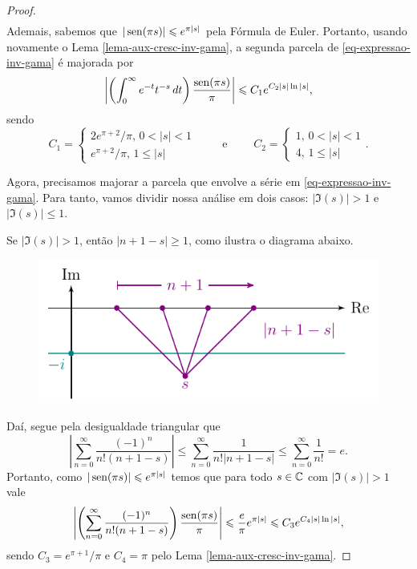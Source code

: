 \begin{proof}
\begin{align*}
        \end{align*}
        Ademais, sabemos que $|\operatorname{sen}(\pi s)| \leqslant e^{\pi |s|}$ pela Fórmula de Euler. 
        Portanto,
        usando novamente o Lema \ref{lema-aux-cresc-inv-gama},
        a segunda parcela de \eqref{eq-expressao-inv-gama} é majorada por
        \begin{equation}
            \left| \left( \int_0^{\infty} e^{-t}t^{-s} \, dt \right)\frac{\operatorname{sen}(\pi s)}{\pi} \right|
            \leqslant
            C_1e^{C_2|s|\ln|s|},
        \end{equation}
        sendo
        \[
        C_1 = \begin{cases}
            2e^{\pi + 2}/\pi, \, 0 < |s| < 1 \\
            e^{\pi + 2}/\pi, \, 1\leq |s|
        \end{cases} \qquad \text{ e } \qquad
        C_2 = \begin{cases}
            1, \, 0 < |s| < 1 \\
            4, \, 1\leq |s|
        \end{cases}.
        \]
        
        Agora, precisamos majorar a parcela que envolve a série em \eqref{eq-expressao-inv-gama}.
        Para tanto, vamos dividir nossa análise em dois casos: $|\Im(s)| > 1$ e $|\Im(s)|\leq 1$.
        
        Se $|\Im(s)| > 1$, então $|n+1-s| \geq 1$, como ilustra o diagrama abaixo.
        \begin{figure}[H]\centering
            \includegraphics{Figuras/Im(s)>1.pdf}
        \end{figure}
        Daí, segue pela desigualdade triangular que
        \[
        \left| \sum_{n=0}^{\infty} \frac{(-1)^n}{n!(n+1-s)} \right| 
        \leq \sum_{n=0}^{\infty} \frac{1}{n!|n+1-s|} 
        \leq \sum_{n=0}^{\infty} \frac{1}{n!}
        = e.
        \]
        Portanto, como $|\operatorname{sen}(\pi s)| \leqslant e^{\pi |s|}$ temos que para 
        todo $s\in\mathbb{C}$ com $|\Im(s)|>1$
        vale
        \[
        \left| \left(\sum_{n=0}^{\infty} \frac{(-1)^n}{n!(n+1-s)}\right)\frac{\operatorname{sen}(\pi s)}{\pi} \right|
        \leqslant \frac{e}{\pi} e^{\pi |s|}
        \leqslant C_3e^{C_4|s|\ln|s|},
        \]
        sendo $C_3 = e^{\pi + 1}/\pi$ e $C_4 = \pi$ 
        pelo Lema \ref{lema-aux-cresc-inv-gama}.
        

\end{proof}
